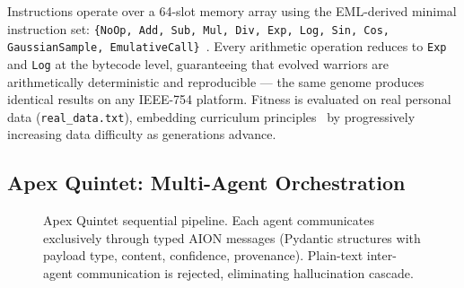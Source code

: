 \documentclass[12pt,a4paper]{article}
\begin{document}
Instructions operate over a 64-slot memory array using the EML-derived minimal instruction set:
\texttt{\{NoOp, Add, Sub, Mul, Div, Exp, Log, Sin, Cos, GaussianSample, EmulativeCall\}}~\cite{odrzywolekEML}.
Every arithmetic operation reduces to \texttt{Exp} and \texttt{Log} at the bytecode level,
guaranteeing that evolved warriors are arithmetically deterministic and reproducible --- the same
genome produces identical results on any IEEE-754 platform.
Fitness is evaluated on real personal data (\texttt{real\_data.txt}), embedding curriculum
principles~\cite{bengio2009curriculum} by progressively increasing data difficulty as generations advance.

\subsection{Apex Quintet: Multi-Agent Orchestration}

\begin{figure}[H]
\centering
{}
\caption{Apex Quintet sequential pipeline. Each agent communicates exclusively through typed AION
messages (Pydantic structures with payload type, content, confidence, provenance). Plain-text
inter-agent communication is rejected, eliminating hallucination cascade.}
\label{fig:apex}
\end{figure}
\end{document}
